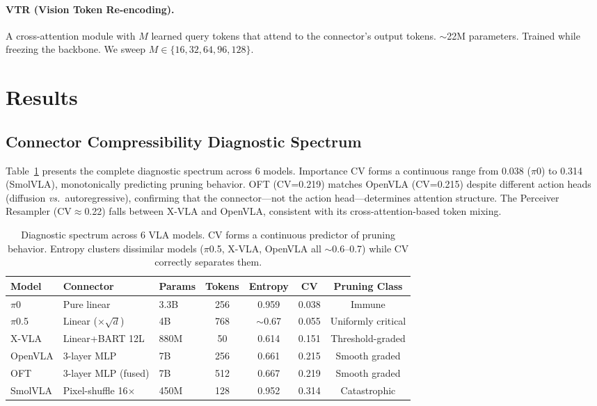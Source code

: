 \documentclass[10pt,letterpaper]{article}
\newcommand{\vs}{\textit{vs.}}
\begin{document}
\paragraph{VTR (Vision Token Re-encoding).} A cross-attention module with $M$ learned query tokens that attend to the connector's output tokens. $\sim$22M parameters. Trained while freezing the backbone. We sweep $M \in \{16, 32, 64, 96, 128\}$.


\section{Results}
\label{sec:results}


\subsection{Connector Compressibility Diagnostic Spectrum}
\label{sec:diagnostic}

Table~\ref{tab:diagnostic} presents the complete diagnostic spectrum across 6 models. Importance CV forms a continuous range from 0.038 ($\pi$0) to 0.314 (SmolVLA), monotonically predicting pruning behavior. OFT (CV=0.219) matches OpenVLA (CV=0.215) despite different action heads (diffusion \vs\ autoregressive), confirming that the connector---not the action head---determines attention structure. The Perceiver Resampler (CV$\approx$0.22) falls between X-VLA and OpenVLA, consistent with its cross-attention-based token mixing.

\begin{table}[t]
\centering
\caption{Diagnostic spectrum across 6 VLA models. CV forms a continuous predictor of pruning behavior. Entropy clusters dissimilar models ($\pi$0.5, X-VLA, OpenVLA all $\sim$0.6--0.7) while CV correctly separates them.}
\label{tab:diagnostic}
\small
\begin{tabular}{lllcccc}
\toprule
Model & Connector & Params & Tokens & Entropy & CV & Pruning Class \\
\midrule
$\pi$0 & Pure linear & 3.3B & 256 & 0.959 & 0.038 & Immune \\
$\pi$0.5 & Linear ($\times\!\sqrt{d}$) & 4B & 768 & $\sim$0.67 & 0.055 & Uniformly critical \\
X-VLA & Linear+BART 12L & 880M & 50 & 0.614 & 0.151 & Threshold-graded \\
OpenVLA & 3-layer MLP & 7B & 256 & 0.661 & 0.215 & Smooth graded \\
OFT & 3-layer MLP (fused) & 7B & 512 & 0.667 & 0.219 & Smooth graded \\
SmolVLA & Pixel-shuffle 16$\times$ & 450M & 128 & 0.952 & 0.314 & Catastrophic \\
\bottomrule
\end{tabular}
\end{table}
\end{document}
